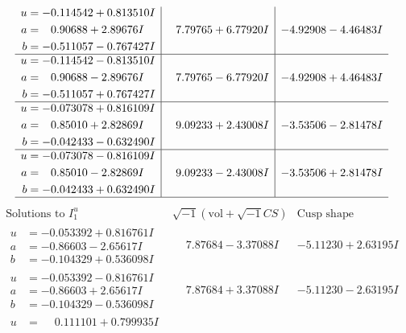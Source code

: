 \documentclass[1p]{elsarticle_modified}
\theoremstyle{definition}
\newcommand{\I}{\sqrt{-1}}
\begin{document}
$$\begin{array}{c|c|c}
\begin{aligned}
u &= -0.114542 + 0.813510 I \\
a &= \phantom{-}0.90688 + 2.89676 I \\
b &= -0.511057 - 0.767427 I\end{aligned}
 & \phantom{-}7.79765 + 6.77920 I & -4.92908 - 4.46483 I \\ \hline\begin{aligned}
u &= -0.114542 - 0.813510 I \\
a &= \phantom{-}0.90688 - 2.89676 I \\
b &= -0.511057 + 0.767427 I\end{aligned}
 & \phantom{-}7.79765 - 6.77920 I & -4.92908 + 4.46483 I \\ \hline\begin{aligned}
u &= -0.073078 + 0.816109 I \\
a &= \phantom{-}0.85010 + 2.82869 I \\
b &= -0.042433 - 0.632490 I\end{aligned}
 & \phantom{-}9.09233 + 2.43008 I & -3.53506 - 2.81478 I \\ \hline\begin{aligned}
u &= -0.073078 - 0.816109 I \\
a &= \phantom{-}0.85010 - 2.82869 I \\
b &= -0.042433 + 0.632490 I\end{aligned}
 & \phantom{-}9.09233 - 2.43008 I & -3.53506 + 2.81478 I\\
 \hline 
 \end{array}$$\newpage$$\begin{array}{c|c|c}  
\text{Solutions to }I^u_{1}& \I (\text{vol} + \sqrt{-1}CS) & \text{Cusp shape}\\
 \hline 
\begin{aligned}
u &= -0.053392 + 0.816761 I \\
a &= -0.86603 - 2.65617 I \\
b &= -0.104329 + 0.536098 I\end{aligned}
 & \phantom{-}7.87684 - 3.37088 I & -5.11230 + 2.63195 I \\ \hline\begin{aligned}
u &= -0.053392 - 0.816761 I \\
a &= -0.86603 + 2.65617 I \\
b &= -0.104329 - 0.536098 I\end{aligned}
 & \phantom{-}7.87684 + 3.37088 I & -5.11230 - 2.63195 I \\ \hline\begin{aligned}
u &= \phantom{-}0.111101 + 0.799935 I \\

\end{aligned}
\end{array}$$
\end{document}
